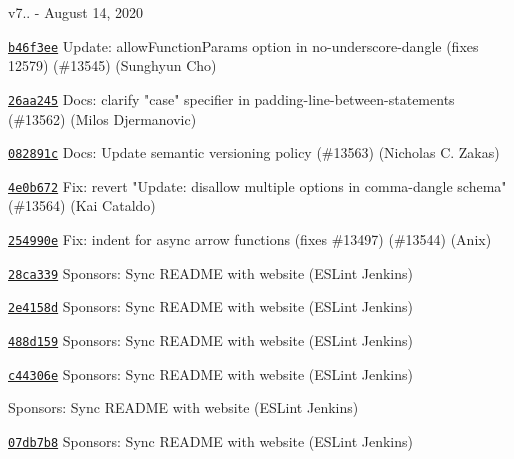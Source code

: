 v7.. -\/ August 14, 2020


\begin{DoxyItemize}
\item \href{https://github.com/eslint/eslint/commit/b46f3ee0dae4add9df99cae940b641ad8de58b9e}{\texttt{ {\ttfamily b46f3ee}}} Update\+: allow\+Function\+Params option in no-\/underscore-\/dangle (fixes 12579) (\#13545) (Sunghyun Cho)
\item \href{https://github.com/eslint/eslint/commit/26aa2452b5f407fabc25dad21182180e4d3be532}{\texttt{ {\ttfamily 26aa245}}} Docs\+: clarify "{}case"{} specifier in padding-\/line-\/between-\/statements (\#13562) (Milos Djermanovic)
\item \href{https://github.com/eslint/eslint/commit/082891c042d72953fe86cd3ce9c96e661760793d}{\texttt{ {\ttfamily 082891c}}} Docs\+: Update semantic versioning policy (\#13563) (Nicholas C. Zakas)
\item \href{https://github.com/eslint/eslint/commit/4e0b672eb4bf39f7502a550b08b25a56a196f19f}{\texttt{ {\ttfamily 4e0b672}}} Fix\+: revert "{}\+Update\+: disallow multiple options in comma-\/dangle schema"{} (\#13564) (Kai Cataldo)
\item \href{https://github.com/eslint/eslint/commit/254990e87914457ca25ea2d7ee012964e56fc9e5}{\texttt{ {\ttfamily 254990e}}} Fix\+: indent for async arrow functions (fixes \#13497) (\#13544) (Anix)
\item \href{https://github.com/eslint/eslint/commit/28ca339259b07c96c73f2ef28cbf112b96395855}{\texttt{ {\ttfamily 28ca339}}} Sponsors\+: Sync README with website (ESLint Jenkins)
\item \href{https://github.com/eslint/eslint/commit/2e4158d3ec9cfed6400bf70795fd7171e96ff9b3}{\texttt{ {\ttfamily 2e4158d}}} Sponsors\+: Sync README with website (ESLint Jenkins)
\item \href{https://github.com/eslint/eslint/commit/488d1595aef43c4d52cccdb2c97977884f0375a8}{\texttt{ {\ttfamily 488d159}}} Sponsors\+: Sync README with website (ESLint Jenkins)
\item \href{https://github.com/eslint/eslint/commit/c44306e52778309a79232ceab8b55a9aa0f2dfda}{\texttt{ {\ttfamily c44306e}}} Sponsors\+: Sync README with website (ESLint Jenkins)
\item \href{https://github.com/eslint/eslint/commit/6677180495e16a02d150d0552e7e5d5f6b77fcc5}{\texttt{ {}}} Sponsors\+: Sync README with website (ESLint Jenkins)
\item \href{https://github.com/eslint/eslint/commit/07db7b8080c2f68ee28e7d447db356c33e6fddce}{\texttt{ {\ttfamily 07db7b8}}} Sponsors\+: Sync README with website (ESLint Jenkins)

\end{DoxyItemize}
